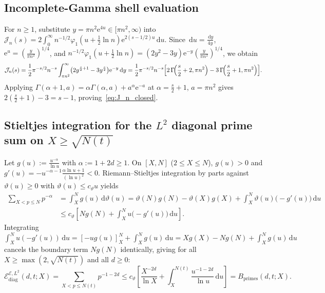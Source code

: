 \documentclass[11pt,reqno]{amsart}
\theoremstyle{plain}
\theoremstyle{definition}
\theoremstyle{remark}
\numberwithin{equation}{section}
\newcommand{\dd}{\,\mathrm{d}}
\newcommand{\ee}{\mathrm{e}}
\begin{document}
\subsection{Incomplete-Gamma shell evaluation}\label{app:gamma}

For $n \ge 1$, substitute $y = \pi n^2\ee^{4u} \in [\pi n^2, \infty)$ into $\mathcal{J}_n(s) = 2\int_0^{\infty} n^{-1/2}\varphi_1(u + \frac{1}{2}\ln n)\ee^{2(s-1/2)u}\dd u$. Since $\dd u = \frac{\dd y}{4y}$, $\ee^u = (\frac{y}{\pi n^2})^{1/4}$, and $n^{-1/2}\varphi_1(u + \frac{1}{2}\ln n) = (2y^2 - 3y)\ee^{-y}(\frac{y}{\pi n^2})^{1/4}$, we obtain
\[
\mathcal{J}_n(s) = \frac{1}{2}\pi^{-s/2}n^{-s}\int_{\pi n^2}^{\infty} \bigl(2y^{\frac{s}{2}+1} - 3y^{\frac{s}{2}}\bigr)\ee^{-y}\dd y
= \frac{1}{2}\pi^{-s/2}n^{-s}\Bigl[2\,\Gamma\!\Bigl(\frac{s}{2}+2,\pi n^2\Bigr) - 3\,\Gamma\!\Bigl(\frac{s}{2}+1,\pi n^2\Bigr)\Bigr].
\]
Applying $\Gamma(\alpha + 1, a) = \alpha\Gamma(\alpha, a) + a^\alpha\ee^{-a}$ at $\alpha = \frac{s}{2} + 1$, $a = \pi n^2$ gives $2(\frac{s}{2}+1) - 3 = s - 1$, proving~\eqref{eq:J_n_closed}.

\subsection{Stieltjes integration for the $L^2$ diagonal prime sum on $X \ge \sqrt{N(t)}$}\label{app:stieltjes}

Let $g(u) := \frac{u^{-\alpha}}{\ln u}$ with $\alpha := 1 + 2d \ge 1$. On $[X, N]$ ($2 \le X \le N$), $g(u) > 0$ and $g'(u) = -u^{-\alpha-1}\frac{\alpha\ln u + 1}{(\ln u)^2} < 0$. Riemann--Stieltjes integration by parts against $\vartheta(u) \ge 0$ with $\vartheta(u) \le c_\vartheta u$ yields
\begin{align*}
\sum_{X < p \le N} p^{-\alpha} &= \int_X^N g(u)\dd\vartheta(u) = \vartheta(N)g(N) - \vartheta(X)g(X) + \int_X^N \vartheta(u)\bigl(-g'(u)\bigr)\dd u \\
&\le c_\vartheta\left[N g(N) + \int_X^N u\bigl(-g'(u)\bigr)\dd u\right].
\end{align*}
Integrating $\int_X^N u(-g'(u))\dd u = [-u g(u)]_X^N + \int_X^N g(u)\dd u = X g(X) - N g(N) + \int_X^N g(u)\dd u$ cancels the boundary term $N g(N)$ identically, giving for all $X \ge \max(2, \sqrt{N(t)})$ and all $d \ge 0$:
\begin{equation}\label{eq:exact_ibp_stieltjes}
\mathcal{E}_{\mathrm{diag}}^{\mathcal{E},L^2}(d,t; X) = \sum_{X < p \le N(t)} p^{-1-2d} \le c_\vartheta\left[\frac{X^{-2d}}{\ln X} + \int_X^{N(t)} \frac{u^{-1-2d}}{\ln u}\dd u\right] = B_{\mathrm{primes}}(d,t; X).
\end{equation}
\end{document}

